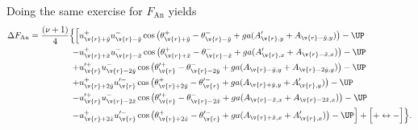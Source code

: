 Doing the same exercise for $F_\text{An}$ yields
\begin{equation}
  \begin{split}
	\Delta F_\text{An} = \frac{(\nu+1)}{4}\Big\{\Big[&u^+_{\v{r}+\hat{y}}u_{\v{r}-\hat{y}}^-\cos\big(\theta^+_{\v{r}+\hat{y}}-\theta^-_{\v{r}-\hat{y}} + ga(A'_{\v{r},y}+A_{\v{r}-\hat{y},y})\big) - \UP\\
	  -&u_{\v{r}+\hat{x}}^+u_{\v{r}-\hat{x}}^-\cos\big(\theta_{\v{r}+\hat{x}}^+-\theta_{\v{r}-\hat{x}}^- + ga(A'_{\v{r},x}+A_{\v{r}-\hat{x},x})\big) - \UP\\
	  +&u_\v{r}^{\prime +}u_{\v{r}-2\hat{y}}^-\cos\big(\theta^{\prime +}_\v{r}-\theta^-_{\v{r}-2\hat{y}} + ga(A_{\v{r}-\hat{y},y}+A_{\v{r}-2\hat{y},y})\big) - \UP\\
	  +&u_{\v{r}+2\hat{y}}^+u^{\prime -}_\v{r}\cos\big(\theta^+_{\v{r}+2\hat{y}}-\theta^{\prime -}_\v{r} + ga(A_{\v{r}+\hat{y},y}+A'_{\v{r},y})\big) - \UP\\
	  -&u_\v{r}^{\prime +}u_{\v{r}-2\hat{x}}^-\cos\big(\theta^{\prime +}_\v{r}-\theta^-_{\v{r}-2\hat{x}} + ga(A_{\v{r}-\hat{x},x}+A_{\v{r}-2\hat{x},x})\big) - \UP\\
	-&u_{\v{r}+2\hat{x}}^+u_\v{r}^{\prime -}\cos\big(\theta^+_{\v{r}+2\hat{x}}-\theta^{\prime -}_\v{r} + ga(A_{\v{r}+\hat{x},x}+A'_{\v{r},x})\big) - \UP\Big] + \Big[+\leftrightarrow-\Big]\Big\}.
  \end{split}
  \label{eq:sreg:DFAn}
\end{equation}

